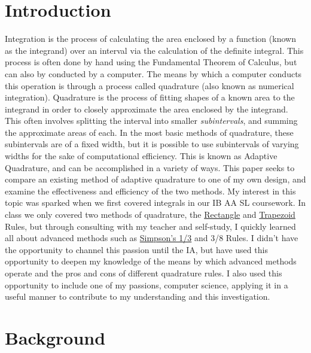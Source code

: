 \documentclass{paper}
\begin{document}
\insertTitlePage
\tableofcontents
\thispagestyle{empty}
\newpage
\setcounter{page}{1}
\justifying

\section{Introduction}
\label{sec:intro}
Integration is the process of calculating the area enclosed by a function (known as the integrand) over an interval via the calculation of the definite integral.
This process is often done by hand using the Fundamental Theorem of Calculus, but can also by conducted by a computer.
The means by which a computer conducts this operation is through a process called quadrature (also known as numerical integration).
Quadrature is the process of fitting shapes of a known area to the integrand in order to closely approximate the area enclosed by the integrand.
This often involves splitting the interval into smaller \textit{subintervals}, and summing the approximate areas of each.
In the most basic methods of quadrature, these subintervals are of a fixed width, but it is possible to use subintervals of varying widths for the sake of computational efficiency.
This is known as Adaptive Quadrature, and can be accomplished in a variety of ways.
This paper seeks to compare an existing method of adaptive quadrature to one of my own design, and examine the effectiveness and efficiency of the two methods.
My interest in this topic was sparked when we first covered integrals in our IB AA SL coursework.
In class we only covered two methods of quadrature, the \hyperref[sec:rect_rule]{Rectangle} and \hyperref[sec:trap_rule]{Trapezoid} Rules, but through consulting with my teacher and self-study, I quickly learned all about advanced methods such as \hyperref[sec:smps_rule]{Simpson's 1/3} and 3/8 Rules.
I didn't have the opportunity to channel this passion until the IA, but have used this opportunity to deepen my knowledge of the means by which advanced methods operate and the pros and cons of different quadrature rules.
I also used this opportunity to include one of my passions, computer science, applying it in a useful manner to contribute to my understanding and this investigation.

\newpage %

\section{Background}
\label{sec:background}
\end{document}
